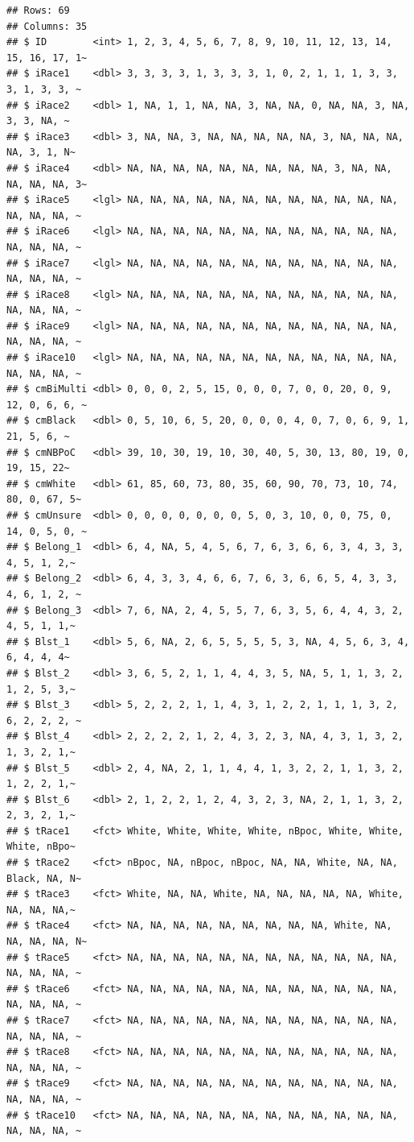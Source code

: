 \documentclass[
  11pt,
]{book}
\begin{document}
\begin{verbatim}
## Rows: 69
## Columns: 35
## $ ID        <int> 1, 2, 3, 4, 5, 6, 7, 8, 9, 10, 11, 12, 13, 14, 15, 16, 17, 1~
## $ iRace1    <dbl> 3, 3, 3, 3, 1, 3, 3, 3, 1, 0, 2, 1, 1, 1, 3, 3, 3, 1, 3, 3, ~
## $ iRace2    <dbl> 1, NA, 1, 1, NA, NA, 3, NA, NA, 0, NA, NA, 3, NA, 3, 3, NA, ~
## $ iRace3    <dbl> 3, NA, NA, 3, NA, NA, NA, NA, NA, 3, NA, NA, NA, NA, 3, 1, N~
## $ iRace4    <dbl> NA, NA, NA, NA, NA, NA, NA, NA, NA, 3, NA, NA, NA, NA, NA, 3~
## $ iRace5    <lgl> NA, NA, NA, NA, NA, NA, NA, NA, NA, NA, NA, NA, NA, NA, NA, ~
## $ iRace6    <lgl> NA, NA, NA, NA, NA, NA, NA, NA, NA, NA, NA, NA, NA, NA, NA, ~
## $ iRace7    <lgl> NA, NA, NA, NA, NA, NA, NA, NA, NA, NA, NA, NA, NA, NA, NA, ~
## $ iRace8    <lgl> NA, NA, NA, NA, NA, NA, NA, NA, NA, NA, NA, NA, NA, NA, NA, ~
## $ iRace9    <lgl> NA, NA, NA, NA, NA, NA, NA, NA, NA, NA, NA, NA, NA, NA, NA, ~
## $ iRace10   <lgl> NA, NA, NA, NA, NA, NA, NA, NA, NA, NA, NA, NA, NA, NA, NA, ~
## $ cmBiMulti <dbl> 0, 0, 0, 2, 5, 15, 0, 0, 0, 7, 0, 0, 20, 0, 9, 12, 0, 6, 6, ~
## $ cmBlack   <dbl> 0, 5, 10, 6, 5, 20, 0, 0, 0, 4, 0, 7, 0, 6, 9, 1, 21, 5, 6, ~
## $ cmNBPoC   <dbl> 39, 10, 30, 19, 10, 30, 40, 5, 30, 13, 80, 19, 0, 19, 15, 22~
## $ cmWhite   <dbl> 61, 85, 60, 73, 80, 35, 60, 90, 70, 73, 10, 74, 80, 0, 67, 5~
## $ cmUnsure  <dbl> 0, 0, 0, 0, 0, 0, 0, 5, 0, 3, 10, 0, 0, 75, 0, 14, 0, 5, 0, ~
## $ Belong_1  <dbl> 6, 4, NA, 5, 4, 5, 6, 7, 6, 3, 6, 6, 3, 4, 3, 3, 4, 5, 1, 2,~
## $ Belong_2  <dbl> 6, 4, 3, 3, 4, 6, 6, 7, 6, 3, 6, 6, 5, 4, 3, 3, 4, 6, 1, 2, ~
## $ Belong_3  <dbl> 7, 6, NA, 2, 4, 5, 5, 7, 6, 3, 5, 6, 4, 4, 3, 2, 4, 5, 1, 1,~
## $ Blst_1    <dbl> 5, 6, NA, 2, 6, 5, 5, 5, 5, 3, NA, 4, 5, 6, 3, 4, 6, 4, 4, 4~
## $ Blst_2    <dbl> 3, 6, 5, 2, 1, 1, 4, 4, 3, 5, NA, 5, 1, 1, 3, 2, 1, 2, 5, 3,~
## $ Blst_3    <dbl> 5, 2, 2, 2, 1, 1, 4, 3, 1, 2, 2, 1, 1, 1, 3, 2, 6, 2, 2, 2, ~
## $ Blst_4    <dbl> 2, 2, 2, 2, 1, 2, 4, 3, 2, 3, NA, 4, 3, 1, 3, 2, 1, 3, 2, 1,~
## $ Blst_5    <dbl> 2, 4, NA, 2, 1, 1, 4, 4, 1, 3, 2, 2, 1, 1, 3, 2, 1, 2, 2, 1,~
## $ Blst_6    <dbl> 2, 1, 2, 2, 1, 2, 4, 3, 2, 3, NA, 2, 1, 1, 3, 2, 2, 3, 2, 1,~
## $ tRace1    <fct> White, White, White, White, nBpoc, White, White, White, nBpo~
## $ tRace2    <fct> nBpoc, NA, nBpoc, nBpoc, NA, NA, White, NA, NA, Black, NA, N~
## $ tRace3    <fct> White, NA, NA, White, NA, NA, NA, NA, NA, White, NA, NA, NA,~
## $ tRace4    <fct> NA, NA, NA, NA, NA, NA, NA, NA, NA, White, NA, NA, NA, NA, N~
## $ tRace5    <fct> NA, NA, NA, NA, NA, NA, NA, NA, NA, NA, NA, NA, NA, NA, NA, ~
## $ tRace6    <fct> NA, NA, NA, NA, NA, NA, NA, NA, NA, NA, NA, NA, NA, NA, NA, ~
## $ tRace7    <fct> NA, NA, NA, NA, NA, NA, NA, NA, NA, NA, NA, NA, NA, NA, NA, ~
## $ tRace8    <fct> NA, NA, NA, NA, NA, NA, NA, NA, NA, NA, NA, NA, NA, NA, NA, ~
## $ tRace9    <fct> NA, NA, NA, NA, NA, NA, NA, NA, NA, NA, NA, NA, NA, NA, NA, ~
## $ tRace10   <fct> NA, NA, NA, NA, NA, NA, NA, NA, NA, NA, NA, NA, NA, NA, NA, ~
\end{verbatim}
\end{document}
